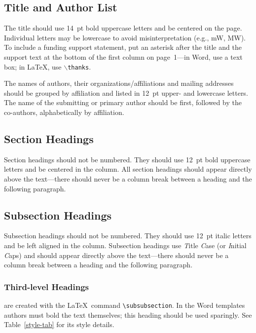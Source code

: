 \documentclass[acus,%
              ]{jacow}
\begin{document}
\subsection{Title and Author List}

The title should use \SI{14}{pt} bold uppercase letters and be centered on the page.
Individual letters may be lowercase to avoid misinterpretation (e.g., mW, MW).
To include a funding support statement, put an asterisk after the title and
the support text at the bottom of the first column on page~1---in Word,
use a text box; in \LaTeX, use $\backslash$\texttt{thanks}.

The names of authors, their organizations/affiliations and mailing addresses
should be grouped by affiliation and listed in \SI{12}{pt} upper- and lowercase letters.
The name of the submitting or primary author should be first, followed by
the co-authors, alphabetically by affiliation.


\subsection{Section Headings}

Section headings should not be numbered. They should
use  \SI{12}{pt}  bold  uppercase  letters  and  be  centered  in  the
column. All section headings should appear directly above
the text---there should never be a column break between a heading and the
following paragraph.

\subsection{Subsection Headings}

Subsection  headings  should  not  be  numbered.
They should use \SI{12}{pt} italic letters and be left aligned in the column.
Subsection headings use \emph{T}itle \emph{C}ase (or \emph{I}nitial \emph{C}aps)
and should appear directly above the text---there should never be a column break
between a heading and the following paragraph.

\subsubsection{Third-level Headings} are created with the \LaTeX\ command \verb|\subsubsection|.
In the Word templates authors must bold the text themselves; this
heading should be used sparingly. See Table~\ref{style-tab} for its
style details.
\end{document}
